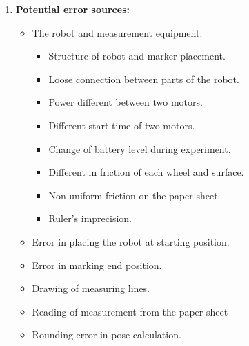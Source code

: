 \documentclass[a4paper, 12pt]{article}
\begin{document}
\begin{enumerate}
		\item \textbf{Potential error sources:}
		\begin{itemize}
			\item The robot and measurement equipment:
			\begin{itemize}
				\item Structure of robot and marker placement.
				\item Loose connection between parts of the robot.
				\item Power different between two motors.
				\item Different start time of two motors.
				\item Change of battery level during experiment.
				\item Different in friction of each wheel and surface.
				\item Non-uniform friction on the paper sheet.
				\item Ruler's imprecision.
			\end{itemize}
			\item Error in placing the robot at starting position.
			\item Error in marking end position.
			\item Drawing of measuring lines.
			\item Reading of measurement from the paper sheet
			\item Rounding error in pose calculation.
		\end{itemize}
		
	\end{enumerate}
	
	
	
\end{document}
